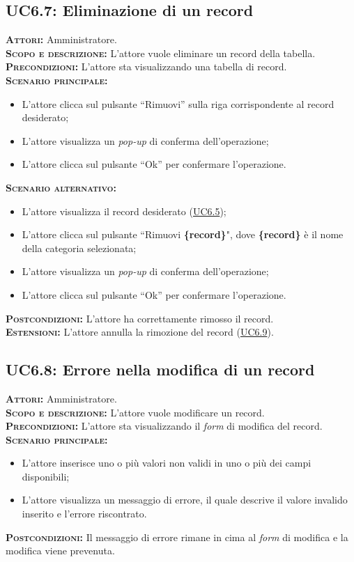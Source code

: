 \subsection{UC6.7: Eliminazione di un record}
\label{sec:UC67}
\textsc{\textbf{Attori:}} Amministratore.\\
\textsc{\textbf{Scopo e descrizione:}} L'attore vuole eliminare un record della tabella.\\
\textsc{\textsc{\textbf{Precondizioni:}}} L'attore sta visualizzando una tabella di record.\\
\textsc{\textbf{Scenario principale:}}
\begin{itemize}
    \item L'attore clicca sul pulsante ``Rimuovi'' sulla riga corrispondente al record desiderato;
    \item L'attore visualizza un \textit{pop-up} di conferma dell'operazione;
    \item L'attore clicca sul pulsante ``Ok'' per confermare l'operazione.
\end{itemize}
\textsc{\textbf{Scenario alternativo:}}
\begin{itemize}
    \item L'attore visualizza il record desiderato (\hyperref[sec:UC65]{UC6.5});
    \item L'attore clicca sul pulsante ``Rimuovi \textbf{\{record\}}", dove \textbf{\{record\}} è il nome della categoria selezionata;
    \item L'attore visualizza un \textit{pop-up} di conferma dell'operazione;
    \item L'attore clicca sul pulsante ``Ok'' per confermare l'operazione.
\end{itemize}
\textsc{\textbf{Postcondizioni:}} L'attore ha correttamente rimosso il record.\\
\textsc{\textbf{Estensioni:}} L'attore annulla la rimozione del record (\hyperref[sec:UC69]{UC6.9}).

\subsection{UC6.8: Errore nella modifica di un record}
\label{sec:UC68}
\textsc{\textbf{Attori:}} Amministratore.\\
\textsc{\textbf{Scopo e descrizione:}} L'attore vuole modificare un record.\\
\textsc{\textsc{\textbf{Precondizioni:}}} L'attore sta visualizzando il \textit{form} di modifica del record.\\
\textsc{\textbf{Scenario principale:}} 
\begin{itemize}
    \item L'attore inserisce uno o più valori non validi in uno o più dei campi disponibili;
    \item L'attore visualizza un messaggio di errore, il quale descrive il valore invalido inserito e l'errore riscontrato.
\end{itemize}
\textsc{\textbf{Postcondizioni:}} Il messaggio di errore rimane in cima al \textit{form} di modifica e la modifica viene prevenuta.

